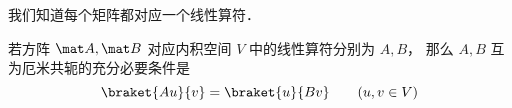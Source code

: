 
\begin{issues}
\issueDraft
\end{issues}


我们知道每个矩阵都对应一个线性算符．

\begin{theorem}{}
若方阵 $\mat A, \mat B$ 对应内积空间 $V$ 中的线性算符分别为 $A, B$， 那么 $A, B$ 互为厄米共轭的充分必要条件是
\begin{equation}
\braket{Au}{v} = \braket{u}{B v} \qquad (u, v \in V)
\end{equation}
\end{theorem}

